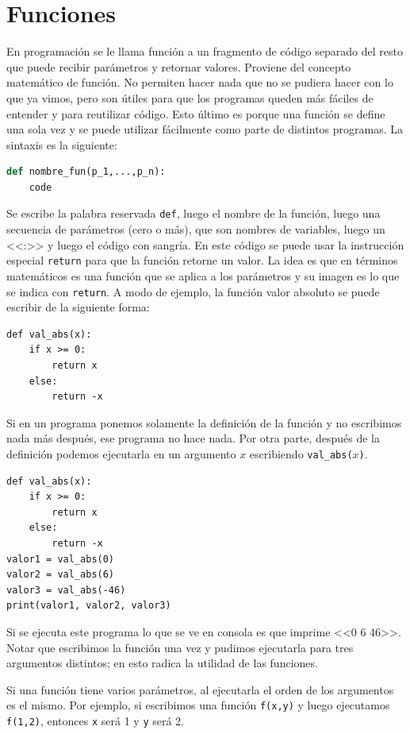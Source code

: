 \documentclass[a4paper, 12pt]{report}
\theoremstyle{definition}
\begin{document}
\section{Funciones}

En programación se le llama función a un fragmento de código separado del resto que puede recibir parámetros y retornar valores. Proviene del concepto matemático de función. No permiten hacer nada que no se pudiera hacer con lo que ya vimos, pero son útiles para que los programas queden más fáciles de entender y para reutilizar código. Esto último es porque una función se define una sola vez y se puede utilizar fácilmente como parte de distintos programas. La sintaxis es la siguiente:
\begin{lstlisting}[language=python]
def nombre_fun(p_1,...,p_n):
    code	
\end{lstlisting}
Se escribe la palabra reservada {\tt def}, luego el nombre de la función, luego una secuencia de parámetros (cero o más), que son nombres de variables, luego un <<:>> y luego el código con sangría. En este código se puede usar la instrucción especial {\tt return} para que la función retorne un valor. La idea es que en términos matemáticos es una función que se aplica a los parámetros y su imagen es lo que se indica con {\tt return}. A modo de ejemplo, la función valor absoluto se puede escribir de la siguiente forma:
\begin{verbatim}
def val_abs(x):
    if x >= 0:
        return x
    else:
        return -x
\end{verbatim}
Si en un programa ponemos solamente la definición de la función y no escribimos nada más después, ese programa no hace nada. Por otra parte, después de la definición podemos ejecutarla en un argumento $x$ escribiendo {\tt val\_abs($x$)}. 

\begin{verbatim}
def val_abs(x):
    if x >= 0:
        return x
    else:
        return -x
valor1 = val_abs(0)
valor2 = val_abs(6)
valor3 = val_abs(-46)
print(valor1, valor2, valor3)
\end{verbatim}
Si se ejecuta este programa lo que se ve en consola es que imprime <<0 6 46>>. Notar que escribimos la función una vez y pudimos ejecutarla para tres argumentos distintos; en esto radica la utilidad de las funciones.

Si una función tiene varios parámetros, al ejecutarla el orden de los argumentos es el mismo. Por ejemplo, si escribimos una función {\tt f(x,y)} y luego ejecutamos {\tt f(1,2)}, entonces {\tt x} será 1 y {\tt y} será 2.
\end{document}
